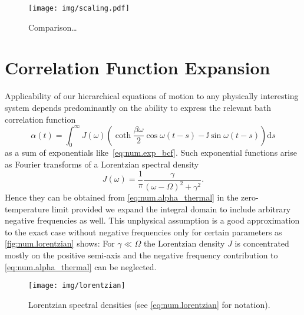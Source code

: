 \begin{figure}
  \centering
  \texttt{[image: img/scaling.pdf]}
  \caption{Comparison\dots}
  \label{fig:num.scaling}
\end{figure}


\section{Correlation Function Expansion}
\label{sec:num.expansion}

Applicability of our hierarchical equations of motion to any physically interesting system depends predominantly on the ability to express the relevant bath correlation function
\begin{equation}
  \alpha(t) = \int_0^\infty J(\omega) \left( \coth \frac{\beta \omega}{2} \cos \omega(t-s) - \ii\sin \omega(t-s) \right) \mathrm{d}s
  \label{eq:num.alpha_thermal}
\end{equation}
as a sum of exponentials like~\ref{eq:num.exp_bcf}.
Such exponential functions arise as Fourier transforms of a Lorentzian spectral density
\begin{equation}
  J(\omega) = \frac{1}{\pi} \frac{\gamma}{(\omega - \Omega)^2 + \gamma^2}.
  \label{eq:num.lorentzian}
\end{equation}
Hence they can be obtained from \autoref{eq:num.alpha_thermal} in the zero-temperature limit provided we expand the integral domain to include arbitrary negative frequencies as well.
This unphysical assumption is a good approximation to the exact case without negative frequencies only for certain parameters as \autoref{fig:num.lorentzian} shows:
For $\gamma\ll\Omega$ the Lorentzian density $J$ is concentrated mostly on the positive semi-axis and the negative frequency contribution to \autoref{eq:num.alpha_thermal} can be neglected.
\begin{figure}
  \centering
  \texttt{[image: img/lorentzian]}
  \caption{Lorentzian spectral densities (see \autoref{eq:num.lorentzian} for notation).}
  \label{fig:num.lorentzian}
\end{figure}

